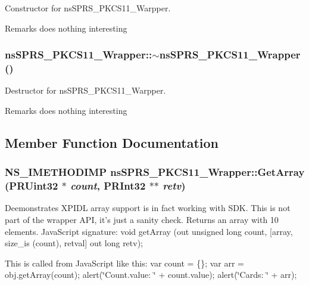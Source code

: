 Constructor for nsSPRS\_\-PKCS11\_\-Warpper. \begin{DoxyRemark}{Remarks}
does nothing interesting 
\end{DoxyRemark}
\hypertarget{classnsSPRS__PKCS11__Wrapper_ae47d3a38404472caa713ff194f085cf5}{
\subsubsection[{$\sim$nsSPRS\_\-PKCS11\_\-Wrapper}]{\setlength{\rightskip}{0pt plus 5cm}nsSPRS\_\-PKCS11\_\-Wrapper::$\sim$nsSPRS\_\-PKCS11\_\-Wrapper ()}}
\label{classnsSPRS__PKCS11__Wrapper_ae47d3a38404472caa713ff194f085cf5}


Destructor for nsSPRS\_\-PKCS11\_\-Warpper. \begin{DoxyRemark}{Remarks}
does nothing interesting 
\end{DoxyRemark}


\subsection{Member Function Documentation}
\hypertarget{classnsSPRS__PKCS11__Wrapper_ab6151d1fd68a16d5a502ca467cb4d990}{
\subsubsection[{GetArray}]{\setlength{\rightskip}{0pt plus 5cm}NS\_\-IMETHODIMP nsSPRS\_\-PKCS11\_\-Wrapper::GetArray (PRUint32 $\ast$ {\em count}, \/  PRInt32 $\ast$$\ast$ {\em retv})}}
\label{classnsSPRS__PKCS11__Wrapper_ab6151d1fd68a16d5a502ca467cb4d990}


Deemonstrates XPIDL array support is in fact working with SDK. This is not part of the wrapper API, it's just a sanity check. Returns an array with 10 elements. JavaScript signature: void getArray (out unsigned long count, \mbox{[}array, size\_\-is (count), retval\mbox{]} out long retv);

This is called from JavaScript like this: var count = \{\}; var arr = obj.getArray(count); alert(\char`\"{}Count.value: \char`\"{} + count.value); alert(\char`\"{}Cards: \char`\"{} + arr);


